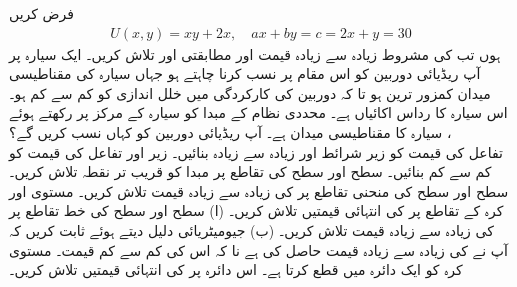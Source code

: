 فرض کریں 
\begin{align*}
U(x,y)=xy+2x, \quad ax+by=c=2x+y=30
\end{align*}
ہوں تب  کی مشروط  زیادہ سے زیادہ قیمت  اور مطابقتی  اور  تلاش کریں۔
ایک  سیارہ پر آپ   ریڈیائی دوربین  کو اس مقام پر نسب کرنا چاہتے ہو جہاں  سیارہ  کی مقناطیسی میدان کمزور ترین ہو تا کہ     دوربین کی کارکردگی میں خلل اندازی کو کم سے کم ہو۔ اس سیارہ کا رداس  اکائیاں ہے۔ محددی نظام کے مبدا کو سیارہ کے مرکز پر  رکھتے ہوئے ، سیارہ  کا  مقناطیسی میدان  ہے۔ آپ ریڈیائی دوربین کو کہاں نسب کریں گے؟
\\
تفاعل  کی قیمت کو  زیر  شرائط  اور  زیادہ سے زیادہ بنائیں۔ 
  زیر    اور تفاعل  کی قیمت کو کم سے کم  بنائیں۔ 
سطح  اور سطح   کی  تقاطع  پر مبدا کو قریب تر نقطہ تلاش کریں۔
سطح  اور سطح   کی منحنی تقاطع  پر  کی زیادہ سے زیادہ قیمت تلاش کریں۔
مستوی  اور کرہ  کے تقاطع پر  کی انتہائی قیمتیں تلاش کریں۔
(ا) سطح  اور سطح  کی خط تقاطع پر    کی زیادہ سے زیادہ قیمت تلاش کریں۔  (ب)  جیومیٹریائی دلیل دیتے ہوئے ثابت کریں کہ آپ نے   کی زیادہ سے زیادہ قیمت حاصل کی ہے نا کہ اس کی کم سے کم قیمت۔
مستوی  کرہ  کو ایک دائرہ میں قطع کرتا ہے۔ اس دائرہ پر   کی انتہائی قیمتیں تلاش کریں۔
